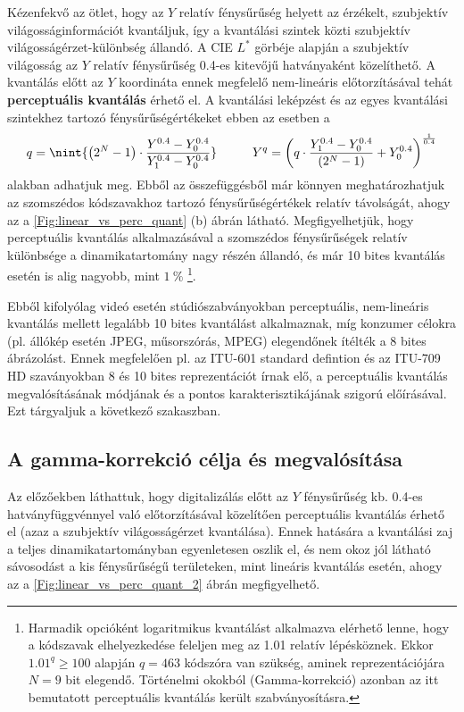 Kézenfekvő az ötlet, hogy az $Y$ relatív fénysűrűség helyett az érzékelt, szubjektív világosságinformációt kvantáljuk, így a kvantálási szintek közti szubjektív világosságérzet-különbség állandó.
A CIE $L^*$ görbéje alapján a szubjektív világosság az $Y$ relatív fénysűrűség 0.4-es kitevőjű hatványaként közelíthető.
A kvantálás előtt az $Y$ koordináta ennek megfelelő nem-lineáris előtorzításával tehát \textbf{perceptuális kvantálás} érhető el.
A kvantálási leképzést és az egyes kvantálási szintekhez tartozó fénysűrűségértékeket ebben az esetben a
\begin{equation}
q =  \nint{ \left( 2^N - 1 \right) \cdot  \frac{Y^{0.4} - Y_0^{0.4} }{Y_1^{0.4} - Y_0^{0.4}} }
\hspace{1cm}
Y^q = \left( q \cdot \frac{Y_1^{0.4} - Y_0^{0.4}}{\left( 2^N - 1 \right) } + Y_0^{0.4} \right)^{\frac{1}{0.4}} 
\end{equation}
alakban adhatjuk meg.
Ebből az összefüggésből már könnyen meghatározhatjuk az szomszédos kódszavakhoz tartozó fénysűrűségértékek relatív távolságát, ahogy az a \ref{Fig:linear_vs_perc_quant} (b) ábrán látható.
Megfigyelhetjük, hogy perceptuális kvantálás alkalmazásával a szomszédos fénysűrűségek relatív különbsége a dinamikatartomány nagy részén állandó, és már 10 bites kvantálás esetén is alig nagyobb, mint $1~\%$ \footnote{Harmadik opcióként logaritmikus kvantálást alkalmazva elérhető lenne, hogy a kódszavak elhelyezkedése feleljen meg az 1.01 relatív lépésköznek.
Ekkor $1.01^q \geq 100$ alapján $q = 463$ kódszóra van szükség, aminek reprezentációjára $N=9$ bit elegendő.
Történelmi okokból (Gamma-korrekció) azonban az itt bemutatott perceptuális kvantálás került szabványosításra.}.

Ebből kifolyólag videó esetén stúdiószabványokban perceptuális, nem-lineáris kvantálás mellett legalább 10 bites kvantálást alkalmaznak, míg konzumer célokra (pl. állókép esetén JPEG, műsorszórás, MPEG) elegendőnek ítélték a  8 bites ábrázolást.
Ennek megfelelően pl. az ITU-601 standard defintion és az ITU-709 HD szaványokban 8 és 10 bites reprezentációt írnak elő, a perceptuális kvantálás megvalósításának módjának és a pontos karakterisztikájának szigorú előírásával.
Ezt tárgyaljuk a következő szakaszban.

\subsection{A gamma-korrekció célja és megvalósítása}

Az előzőekben láthattuk, hogy digitalizálás előtt az $Y$ fénysűrűség kb. 0.4-es hatványfüggvénnyel való előtorzításával közelítően perceptuális kvantálás érhető el (azaz a szubjektív világosságérzet kvantálása).
Ennek hatására a kvantálási zaj a teljes dinamikatartományban egyenletesen oszlik el, és nem okoz jól látható sávosodást a kis fénysűrűségű területeken, mint lineáris kvantálás esetén, ahogy az a \ref{Fig:linear_vs_perc_quant_2} ábrán megfigyelhető.

